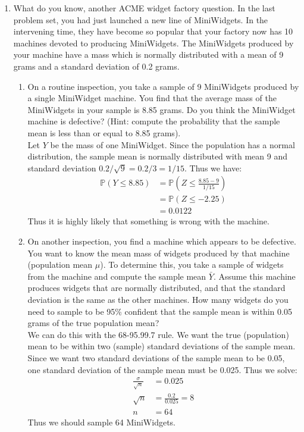 \documentclass[12pt]{article}
\def\P{{\mathbb P}}
\begin{document}
\begin{enumerate}
\item What do you know, another ACME widget factory question. In the last problem set, you had just launched a new line of MiniWidgets. In the intervening time, they have become so popular that your factory now has 10 machines devoted to producing MiniWidgets. The MiniWidgets produced by your machine have a mass which is normally distributed with a mean of 9 grams and a standard deviation of 0.2 grams.
\begin{enumerate}
\item On a routine inspection, you take a sample of 9 MiniWidgets produced by a single MiniWidget machine. You find that the average mass of the MiniWidgets in your sample is 8.85 grams. Do you think the MiniWidget machine is defective? (Hint: compute the probability that the sample mean is less than or equal to 8.85 grams).\\

Let $Y$ be the mass of one MiniWidget. Since the population has a normal distribution, the sample mean is normally distributed with mean 9 and standard deviation $0.2 / \sqrt{9} = 0.2 / 3  = 1/15$. Thus we have:
\begin{align*}
\P(Y \leq 8.85) &= \P \left( Z \leq \frac{8.85 - 9}{1/15} \right) \\
&= \P(Z \leq -2.25) \\
&= 0.0122
\end{align*}
Thus it is highly likely that something is wrong with the machine.

\item On another inspection, you find a machine which appears to be defective. You want to know the mean mass of widgets produced by that machine (population mean $\mu$). To determine this, you take a sample of widgets from the machine and compute the sample mean $\bar{Y}$. Assume this machine produces widgets that are normally distributed, and that the standard deviation is the same as the other machines. How many widgets do you need to sample to be 95\% confident that the sample mean is within 0.05 grams of the true population mean?\\

We can do this with the 68-95.99.7 rule. We want the true (population) mean to be within two (sample) standard deviations of the sample mean. Since we want two standard deviations of the sample mean to be 0.05, one standard deviation of the sample mean must be 0.025. Thus we solve:
\begin{align*}
\frac{\sigma}{\sqrt{n}} &= 0.025 \\
\sqrt{n} &= \frac{0.2}{0.025} = 8\\
n &= 64
\end{align*}
Thus we should sample 64 MiniWidgets.
\end{enumerate}


\end{enumerate}
\end{document}
